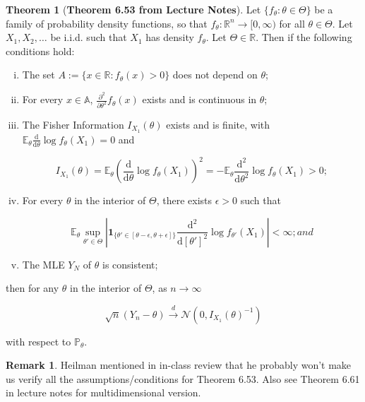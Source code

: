\documentclass{article}
\newcommand{\deriv}[2]{\frac{\mathrm{d} #1}{\mathrm{d} #2}}
\newcommand{\pderiv}[2]{\frac{\partial #1}{\partial #2}}
\newcommand{\E}{\mathbb{E}}
\theoremstyle{definition}
\newtheorem{theorem}{Theorem}
\theoremstyle{definition}
\theoremstyle{definition}
\theoremstyle{definition}
\theoremstyle{definition}
\newtheorem*{remark}{Remark}
\theoremstyle{definition}
\theoremstyle{definition}
\begin{document}
\begin{theorem}[\textbf{Theorem 6.53 from Lecture Notes}] Let \(\{f_\theta: \theta \in \Theta\}\) be a family of probability density functions, so that \(f_\theta: \mathbb{R}^n \to [0, \infty)\) for all \(\theta \in \Theta\). Let \(X_1, X_2, \ldots\) be i.i.d. such that \(X_1\) has density \(f_\theta\). Let \(\Theta \in \mathbb{R}\). Then if the following conditions hold:

\begin{enumerate}[(i)]

\item The set \(A:= \{x \in \mathbb{R}: f_\theta(x) > 0\}\) does not depend on \(\theta\);

\item For every \(x \in \mathbb{A}\), \(\pderiv{^2}{\theta^2} f_\theta(x)\) exists and is continuous in \(\theta\);

\item The Fisher Information \(I_{X_1}(\theta)\) exists and is finite, with \(\E_\theta \deriv{}{\theta} \log f_\theta(X_1) = 0\) and

\[
I_{X_1}(\theta) = \E_\theta \left(  \deriv{}{\theta} \log f_\theta(X_1) \right)^2 = -\E_\theta \deriv{^2}{\theta^2} \log f_\theta(X_1) > 0;
\]

\item For every \(\theta\) in the interior of \(\Theta\), there exists \(\epsilon > 0\) such that

\[
\E_\theta \sup_{\theta' \in \Theta} \left| \boldsymbol{1}_{\{\theta' \in [\theta - \epsilon, \theta + \epsilon]\} } \deriv{^2}{[\theta']^2} \log f_{\theta'}(X_1) \right| < \infty; and
\]

\item The MLE \(Y_N\) of \(\theta\) is consistent;

\end{enumerate}

then for any \(\theta\) in the interior of \(\Theta\), as \(n \to \infty\) 

\[
\sqrt{n}(Y_n - \theta) \xrightarrow{d} \mathcal{N}(0, I_{X_1}(\theta)^{-1})
\]

with respect to \(\mathbb{P}_\theta\).

\end{theorem}

\begin{remark}Heilman mentioned in in-class review that he probably won't make us verify all the assumptions/conditions for Theorem 6.53. Also see Theorem 6.61 in lecture notes for multidimensional version.

\end{remark}
\end{document}
